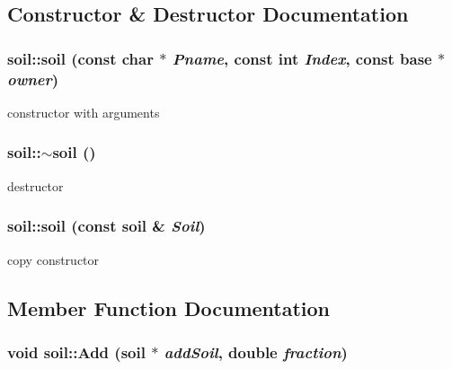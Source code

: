 \subsection{Constructor \& Destructor Documentation}
\hypertarget{classsoil_a289d10d074eff9162a03968bd9240ece}{
\subsubsection[{soil}]{\setlength{\rightskip}{0pt plus 5cm}soil::soil (const char $\ast$ {\em Pname}, \/  const int {\em Index}, \/  const {\bf base} $\ast$ {\em owner})}}
\label{classsoil_a289d10d074eff9162a03968bd9240ece}


constructor with arguments \hypertarget{classsoil_a863db6f7a26049bcac60099234181765}{
\subsubsection[{$\sim$soil}]{\setlength{\rightskip}{0pt plus 5cm}soil::$\sim$soil ()}}
\label{classsoil_a863db6f7a26049bcac60099234181765}


destructor \hypertarget{classsoil_a905aaf29599f8afceb8aa8f51a631def}{
\subsubsection[{soil}]{\setlength{\rightskip}{0pt plus 5cm}soil::soil (const {\bf soil} \& {\em Soil})}}
\label{classsoil_a905aaf29599f8afceb8aa8f51a631def}


copy constructor 

\subsection{Member Function Documentation}
\hypertarget{classsoil_a3902dd1ec4cec0229854d26d0f3dbc14}{
\subsubsection[{Add}]{\setlength{\rightskip}{0pt plus 5cm}void soil::Add ({\bf soil} $\ast$ {\em addSoil}, \/  double {\em fraction})}}
\label{classsoil_a3902dd1ec4cec0229854d26d0f3dbc14}


